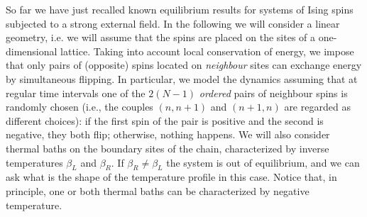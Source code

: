 \documentclass[iop, twocolumns, amssymb,notitlepage]{revtex4-1}
\newcommand{\indice}{n}
\begin{document}
So far we have just recalled known equilibrium results for systems of Ising spins subjected to a strong
external field. In the following we will consider a linear geometry, i.e. we will assume that 
the spins are placed on the sites of a one-dimensional lattice. Taking into 
account local conservation of energy, we impose that only pairs of (opposite) 
spins located on \textit{neighbour} sites can exchange energy by simultaneous 
flipping. In particular, we model the dynamics assuming that at regular time 
intervals one of the $2(N-1)$ \textit{ordered} pairs of neighbour spins is 
randomly chosen (i.e., the couples $(\indice,\indice+1)$ and $(\indice+1,\indice)$ are regarded as 
different choices): if the first spin of the pair is positive and the second is 
negative, they both flip; otherwise, nothing happens. We will also consider 
thermal baths on the boundary sites of the chain, characterized by inverse 
temperatures $\beta_L$ and $\beta_R$. If $\beta_R\ne\beta_L$ the system is out 
of equilibrium, and we can ask what is the shape of the temperature profile in 
this case. Notice that, in principle, one or both thermal baths can be characterized by 
negative temperature.
 
 \iffalse
 \begin{figure}
 \centering
\texttt{[image: spin1.eps]}
\caption{\label{fig:spin1} Inverse temperature profile for the spin chain, 
varying $\gamma$. In the main plot, local inverse temperature $\beta_i$ as a 
function of the (normalized) site coordinate. Different values of $\gamma$ are 
considered for the numerical simulations: only for $\gamma \ge 1$ the 
distribution of the boundary spins  are consistent with the inverse temperatures 
prescribed by the thermal baths, $\beta_L=-2$, $\beta_R=1$. Inset: dependence of 
the average heat flux $j=\sum_{i=1}^N \langle j_i \rangle /N$ on $\gamma$. In all cases,
$h=1$, $N=128$.}
\end{figure}
 \fi
 
\end{document}
